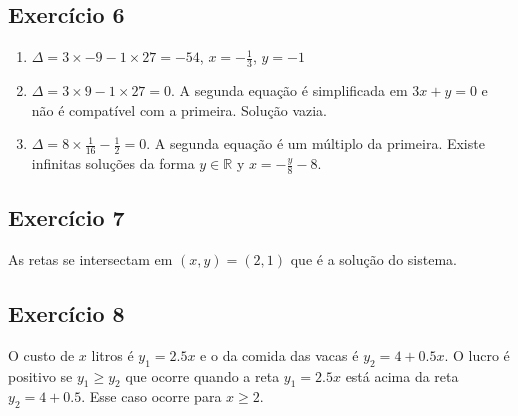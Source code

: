 \subsection*{Exercício 6}

\begin{enumerate}
\item $\Delta = 3 \times -9 - 1 \times 27 = -54$, $x=-\frac{1}{3}$,
  $y = -1$
\item $\Delta = 3 \times 9 - 1 \times 27 = 0$. A segunda equação
  é simplificada em $3x+y=0$ e não é compatível com a primeira. Solução vazia.
\item $\Delta = 8 \times \frac{1}{16} - \frac{1}{2} = 0$. A segunda equação
  é um múltiplo da primeira. Existe infinitas soluções da forma
  $y \in \mathbb R$ y $x = -\frac{y}{8} - 8$.
\end{enumerate}

\subsection*{Exercício 7}

As retas se intersectam em ${(x,y)}={(2,1)}$ que é a solução do sistema.

\begin{center}
\end{center}

\subsection*{Exercício 8}

O custo de $x$ litros é $y_1 = 2.5 x$ e o da comida das vacas é
$y_2 = 4 + 0.5x$. O lucro é positivo se $y_1 \geq y_2$ que ocorre quando
a reta $y_1 = 2.5 x$ está acima da reta $y_2 = 4 + 0.5$. Esse caso ocorre para
$x \geq 2$.


